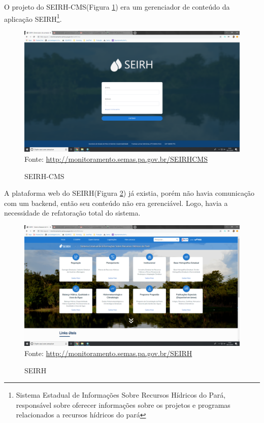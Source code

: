 O projeto do SEIRH-CMS(Figura \ref{fig:seirhCms}) era um gerenciador de conteúdo da aplicação SEIRH\footnote{Sistema Estadual de Informações Sobre Recursos Hídricos do Pará, responsável sobre oferecer informações sobre os projetos e programas relacionados a recursos hídricos do pará}.
\begin{figure}[H]
\centering
\caption{SEIRH-CMS} %
\includegraphics[scale=0.22]{SEIRH-CMS}\\  %
{\small Fonte: \url{http://monitoramento.semas.pa.gov.br/SEIRHCMS}} %
\label{fig:seirhCms} %
\end{figure}
A plataforma web do SEIRH(Figura \ref{fig:seirh}) já existia, porém não havia comunicação com um backend, então seu conteúdo não era gerenciável. Logo, havia a necessidade de refatoração total do sistema.

\begin{figure}[H]
\centering
\caption{SEIRH} %
\includegraphics[scale=0.22]{SEIRH}\\  %
{\small Fonte: \url{http://monitoramento.semas.pa.gov.br/SEIRH}} %
\label{fig:seirh} %
\end{figure}

